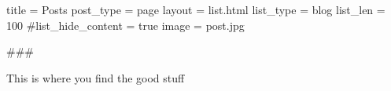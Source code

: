 title = Posts
post_type = page
layout = list.html
list_type = blog
list_len = 100
#list_hide_content = true
image = post.jpg

###

This is where you find the good stuff